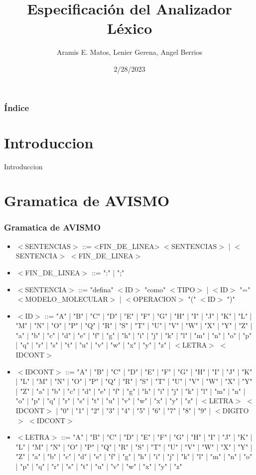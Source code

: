 \documentclass[14pt, aspectratio=169]{beamer}
\title{Especificación del Analizador Léxico}
\author{Aramis E. Matos, Lenier Gerena, Angel Berrios}
\date{2/28/2023}
\begin{document}
\maketitle

\begin{frame}[allowframebreaks]
    \frametitle{Índice}
    \tableofcontents
\end{frame}

\section{Introduccion}

\begin{frame}{Introduccion}
    \cite{narciso_farias_gramatica_2012}

    \cite{tapkeer_flex_2023}
\end{frame}

\section{Gramatica de AVISMO}

\begin{frame}[allowframebreaks]
    \frametitle{Gramatica de AVISMO}
    \begin{itemize}
        \item $<$SENTENCIAS$>$ ::= <FIN\_DE\_LINEA> $<$SENTENCIAS$>$ | $<$SENTENCIA$>$ $<$FIN\_DE\_LINEA$>$
        \item $<$FIN\_DE\_LINEA$>$ ::= ":" | ";"
        \item $<$SENTENCIA$>$ ::= "defina" $<$ID$>$ "como" $<$TIPO$>$ | $<$ID$>$ "="  $<$MODELO\_MOLECULAR$>$ | $<$OPERACION$>$ "(" $<$ID$>$ ")"
        \item $<$ID$>$ ::= "A" | "B" | "C" | "D" | "E" | "F" | "G" | "H" | "I" | "J" | "K" | "L" | "M" | "N" | "O" | "P" | "Q" | "R" | "S" | "T" | "U" | "V" | "W" | "X" | "Y" | "Z" | "a" | "b" | "c" | "d" | "e" | "f" | "g" | "h" | "i" | "j" | "k" | "l" | "m" | "n" | "o" | "p" | "q" | "r" | "s" | "t" | "u" | "v" | "w" | "x" | "y" | "z" | $<$LETRA$>$ $<$IDCONT$>$
        \item $<$IDCONT$>$ ::= "A" | "B" | "C" | "D" | "E" | "F" | "G" | "H" | "I" | "J" | "K" | "L" | "M" | "N" | "O" | "P" | "Q" | "R" | "S" | "T" | "U" | "V" | "W" | "X" | "Y" | "Z" | "a" | "b" | "c" | "d" | "e" | "f" | "g" | "h" | "i" | "j" | "k" | "l" | "m" | "n" | "o" | "p" | "q" | "r" | "s" | "t" | "u" | "v" | "w" | "x" | "y" | "z" | $<$LETRA$>$ $<$IDCONT$>$ | "0" | "1" | "2" | "3" | "4" | "5" | "6" | "7" | "8" | "9" | $<$DIGITO$>$ $<$IDCONT$>$
        \item $<$LETRA$>$ ::= "A" | "B" | "C" | "D" | "E" | "F" | "G" | "H" | "I" | "J" | "K" | "L" | "M" | "N" | "O" | "P" | "Q" | "R" | "S" | "T" | "U" | "V" | "W" | "X" | "Y" | "Z" | "a" | "b" | "c" | "d" | "e" | "f" | "g" | "h" | "i" | "j" | "k" | "l" | "m" | "n" | "o" | "p" | "q" | "r" | "s" | "t" | "u" | "v" | "w" | "x" | "y" | "z"
    \end{itemize}
\end{frame}
\end{document}
